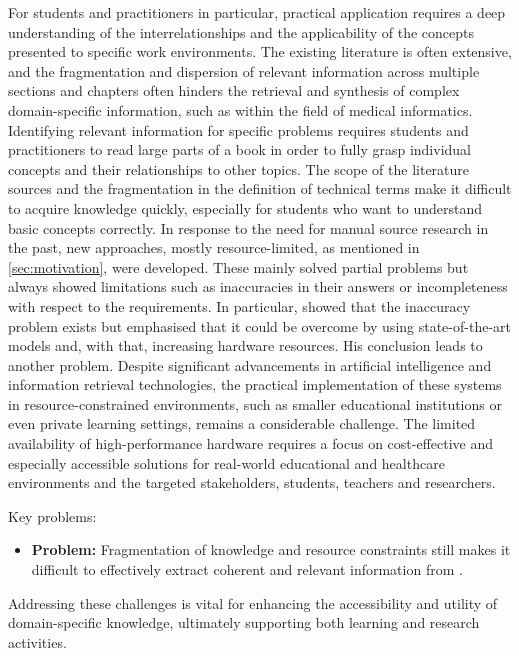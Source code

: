 For students and practitioners in particular, practical application requires a deep understanding of the interrelationships and the applicability of the concepts presented to specific work environments.
The existing literature is often extensive, and the fragmentation and dispersion of relevant information across multiple sections and chapters often hinders the retrieval and synthesis of complex domain-specific information, such as within the field of medical informatics.
Identifying relevant information for specific problems requires students and practitioners to read large parts of a book in order to fully grasp individual concepts and their relationships to other topics.
The scope of the literature sources and the fragmentation in the definition of technical terms make it difficult to acquire knowledge quickly, especially for students who want to understand basic concepts correctly.
%
In response to the need for manual source research in the past, new approaches, mostly resource-limited, as mentioned in \cref{sec:motivation}, were developed. 
These mainly solved partial problems but always showed limitations such as inaccuracies in their answers or incompleteness with respect to the requirements. 
%
In particular, \citet{Paul_Keller} showed that the inaccuracy problem exists but emphasised that it could be overcome by using state-of-the-art models and, with that, increasing hardware resources. 
His conclusion leads to another problem.    
Despite significant advancements in artificial intelligence and information retrieval technologies, the practical implementation of these systems in resource-constrained environments, such as smaller educational institutions or even private learning settings, remains a considerable challenge. 
The limited availability of high-performance hardware requires a focus on cost-effective and especially accessible solutions for real-world educational and healthcare environments and the targeted stakeholders, students, teachers and researchers.

Key problems:
\begin{itemize}
  \item \textbf{Problem:} Fragmentation of knowledge and resource constraints still makes it difficult to effectively extract coherent and relevant information from \citet{bb2}.
\end{itemize}

Addressing these challenges is vital for enhancing the accessibility and utility of domain-specific knowledge, ultimately supporting both learning and research activities. 

